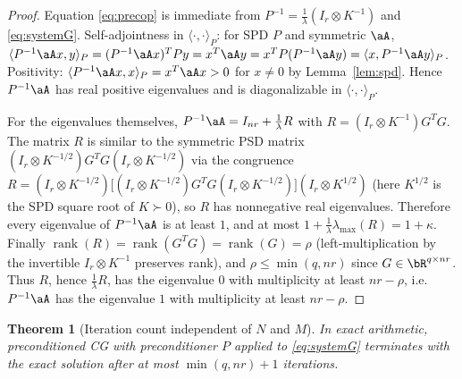 \documentclass[12pt]{article}
\newtheorem{theorem}{Theorem}
\theoremstyle{definition}
\begin{document}
\begin{proof}
Equation \eqref{eq:precop} is immediate from
$P^{-1}=\tfrac1\lambda(I_r\otimes K^{-1})$ and \eqref{eq:systemG}.
Self-adjointness in $\langle\cdot,\cdot\rangle_P$: for SPD $P$ and symmetric
$\aA$, $\langle P^{-1}\aA x,y\rangle_P=(P^{-1}\aA x)^{T}Py=x^{T}\aA y
=x^{T}P(P^{-1}\aA y)=\langle x,P^{-1}\aA y\rangle_P$. Positivity:
$\langle P^{-1}\aA x,x\rangle_P=x^{T}\aA x>0$ for $x\neq0$ by
Lemma~\ref{lem:spd}. Hence $P^{-1}\aA$ has real positive eigenvalues and is
diagonalizable in $\langle\cdot,\cdot\rangle_P$.

For the eigenvalues themselves, $P^{-1}\aA=I_{nr}+\tfrac1\lambda R$ with
$R=(I_r\otimes K^{-1})G^{T}G$. The matrix $R$ is similar to the symmetric PSD
matrix $(I_r\otimes K^{-1/2})G^{T}G(I_r\otimes K^{-1/2})$ via the congruence
$R=(I_r\otimes K^{-1/2})\big[(I_r\otimes K^{-1/2})G^{T}G(I_r\otimes
K^{-1/2})\big](I_r\otimes K^{1/2})$ (here $K^{1/2}$ is the SPD square root of
$K\succ0$), so $R$ has nonnegative real eigenvalues. Therefore every eigenvalue
of $P^{-1}\aA$ is at least $1$, and at most
$1+\tfrac1\lambda\lambda_{\max}(R)=1+\kappa$.
Finally $\operatorname{rank}(R)=\operatorname{rank}(G^{T}G)=\operatorname{rank}(G)=\rho$
(left-multiplication by the invertible $I_r\otimes K^{-1}$ preserves rank), and
$\rho\le\min(q,nr)$ since $G\in\bR^{q\times nr}$. Thus $R$, hence $\tfrac1\lambda
R$, has the eigenvalue $0$ with multiplicity at least $nr-\rho$, i.e.
$P^{-1}\aA$ has the eigenvalue $1$ with multiplicity at least $nr-\rho$.
\end{proof}

\begin{theorem}[Iteration count independent of $N$ and $M$]\label{thm:iters}
In exact arithmetic, preconditioned CG with preconditioner $P$ applied to
\eqref{eq:systemG} terminates with the exact solution after at most
$\min(q,nr)+1$ iterations.
\end{theorem}
\end{document}
